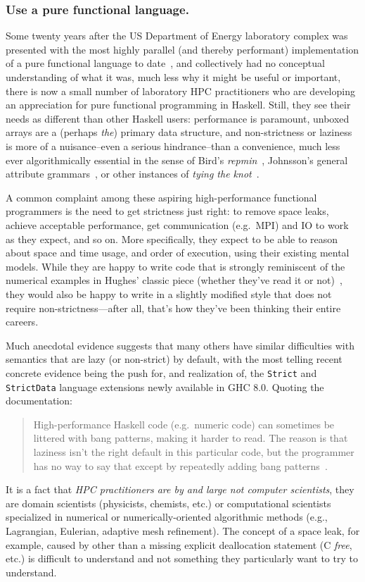 \documentclass{llncs}
\begin{document}
\subsubsection{Use a pure functional language.}
Some twenty years after the US Department of Energy laboratory complex was
presented with the most highly parallel (and thereby performant)
implementation of a pure functional language to date~\cite{Davis96}, and
collectively had no conceptual understanding of what it was, much less why it
might be useful or important, there is now a small number of laboratory HPC
practitioners who are developing an appreciation for pure functional programming
in Haskell.  Still, they see their needs as different than other Haskell
users: performance is paramount, unboxed arrays are a (perhaps \emph{the})
primary data structure, and non-strictness or laziness is more of a
nuisance--even a serious hindrance--than a convenience, much less ever
algorithmically essential in the sense of Bird's \emph{repmin}~\cite{Bird84},
Johnsson's general attribute grammars~\cite{Johnsson87}, or other instances
of \emph{tying the knot}~\cite{tying-the-knot}.

A common complaint among these aspiring high-performance functional
programmers is the need to get strictness just right: to remove space leaks,
achieve acceptable performance, get communication (e.g.\ MPI) and IO to work
as they expect, and so on.  More specifically, they expect to be able to
reason about space and time usage, and order of execution, using their
existing mental models. While they are happy to write code that is strongly
reminiscent of the numerical examples in Hughes' classic piece (whether
they've read it or not)~\cite{Hughes89}, they would also be happy to write in
a slightly modified style that does not require non-strictness---after all,
that's how they've been thinking their entire careers.

Much anecdotal evidence suggests that many others have similar difficulties
with semantics that are lazy (or non-strict) by default, with the most telling
recent concrete evidence being the push for, and realization of, the
\texttt{Strict} and \texttt{StrictData} language extensions newly available in
GHC 8.0.  Quoting the documentation:
\begin{quote}
  High-performance Haskell code (e.g.\ numeric code) can sometimes be littered
  with bang patterns, making it harder to read. The reason is that laziness
  isn't the right default in this particular code, but the programmer has no
  way to say that except by repeatedly adding bang
  patterns~\cite{strict-strictdata}.
\end{quote}
It is a fact that \emph{HPC practitioners are by and large not computer
  scientists}, they are domain scientists (physicists, chemists, etc.) or
computational scientists specialized in numerical or numerically-oriented
algorithmic methods (e.g., Lagrangian, Eulerian, adaptive mesh refinement).
The concept of a space leak, for example, caused by other than a missing
explicit deallocation statement (C \emph{free}, etc.) is difficult to
understand and not something they particularly want to try to understand.
\end{document}
